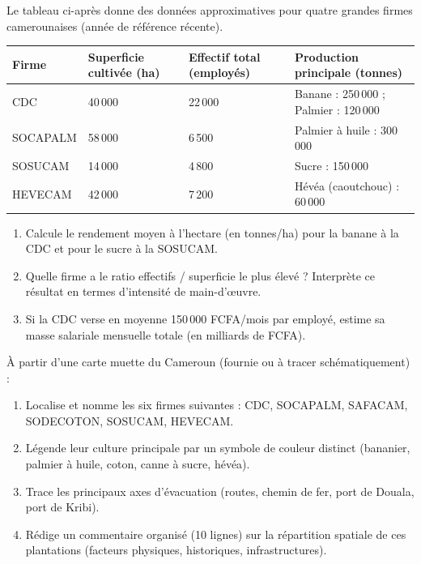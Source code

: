 \documentclass[11pt]{article}
\newcounter{popsec}
\newcounter{popsub}
\newcommand{\courssub}[1]{%
  \stepcounter{popsub}%
  \par\vspace{9pt}\noindent{\popxbold\fontsize{11.5}{13}\selectfont\color{popink}{\color{poporange}\thepopsec.\thepopsub}\hspace{6pt}#1}\par\nopagebreak\vspace{4pt}
}
\begin{document}
\begin{exercice}
Le tableau ci-après donne des données approximatives pour quatre grandes firmes camerounaises (année de référence récente).
\begin{center}
\begin{tabularx}{\linewidth}{|l|X|X|X|}\hline
\textbf{Firme} & \textbf{Superficie cultivée (ha)} & \textbf{Effectif total (employés)} & \textbf{Production principale (tonnes)} \\ \hline
CDC & 40\,000 & 22\,000 & Banane : 250\,000 ; Palmier : 120\,000 \\ \hline
SOCAPALM & 58\,000 & 6\,500 & Palmier à huile : 300\,000 \\ \hline
SOSUCAM & 14\,000 & 4\,800 & Sucre : 150\,000 \\ \hline
HEVECAM & 42\,000 & 7\,200 & Hévéa (caoutchouc) : 60\,000 \\ \hline
\end{tabularx}
\end{center}
\begin{enumerate}
\item Calcule le rendement moyen à l'hectare (en tonnes/ha) pour la banane à la CDC et pour le sucre à la SOSUCAM.
\item Quelle firme a le ratio \og effectifs / superficie \fg{} le plus élevé ? Interprète ce résultat en termes d'intensité de main-d'œuvre.
\item Si la CDC verse en moyenne 150\,000 FCFA/mois par employé, estime sa masse salariale mensuelle totale (en milliards de FCFA).
\end{enumerate}
\end{exercice}

\courssub{Je m'entraîne}

\begin{exercice}
À partir d'une carte muette du Cameroun (fournie ou à tracer schématiquement) :
\begin{enumerate}
\item Localise et nomme les six firmes suivantes : CDC, SOCAPALM, SAFACAM, SODECOTON, SOSUCAM, HEVECAM.
\item Légende leur culture principale par un symbole de couleur distinct (bananier, palmier à huile, coton, canne à sucre, hévéa).
\item Trace les principaux axes d'évacuation (routes, chemin de fer, port de Douala, port de Kribi).
\item Rédige un commentaire organisé (10 lignes) sur la répartition spatiale de ces plantations (facteurs physiques, historiques, infrastructures).
\end{enumerate}
\end{exercice}
\end{document}
